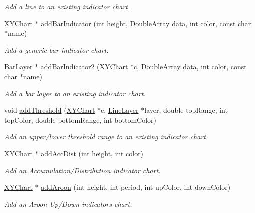 \begin{DoxyCompactItemize}
\begin{DoxyCompactList}\small\item\em Add a line to an existing indicator chart. \end{DoxyCompactList}\item 
\hyperlink{class_x_y_chart}{X\+Y\+Chart} $\ast$ \hyperlink{class_finance_chart_accbcf43fbdc88401416addefeaf06124}{add\+Bar\+Indicator} (int height, \hyperlink{class_double_array}{Double\+Array} data, int color, const char $\ast$name)
\begin{DoxyCompactList}\small\item\em Add a generic bar indicator chart. \end{DoxyCompactList}\item 
\hyperlink{class_bar_layer}{Bar\+Layer} $\ast$ \hyperlink{class_finance_chart_a0578e0d86422fa48ffc07a54c2216d94}{add\+Bar\+Indicator2} (\hyperlink{class_x_y_chart}{X\+Y\+Chart} $\ast$c, \hyperlink{class_double_array}{Double\+Array} data, int color, const char $\ast$name)
\begin{DoxyCompactList}\small\item\em Add a bar layer to an existing indicator chart. \end{DoxyCompactList}\item 
void \hyperlink{class_finance_chart_ae08738c0df88ccd4d75ed3860f353839}{add\+Threshold} (\hyperlink{class_x_y_chart}{X\+Y\+Chart} $\ast$c, \hyperlink{class_line_layer}{Line\+Layer} $\ast$layer, double top\+Range, int top\+Color, double bottom\+Range, int bottom\+Color)
\begin{DoxyCompactList}\small\item\em Add an upper/lower threshold range to an existing indicator chart. \end{DoxyCompactList}\item 
\hyperlink{class_x_y_chart}{X\+Y\+Chart} $\ast$ \hyperlink{class_finance_chart_ae5545f015ca900f2b1300c675f249186}{add\+Acc\+Dist} (int height, int color)
\begin{DoxyCompactList}\small\item\em Add an Accumulation/\+Distribution indicator chart. \end{DoxyCompactList}\item 
\hyperlink{class_x_y_chart}{X\+Y\+Chart} $\ast$ \hyperlink{class_finance_chart_a69096a6af74055fee5f1ae5fc0588a3b}{add\+Aroon} (int height, int period, int up\+Color, int down\+Color)
\begin{DoxyCompactList}\small\item\em Add an Aroon Up/\+Down indicators chart. \end{DoxyCompactList}\item 

\end{DoxyCompactItemize}

